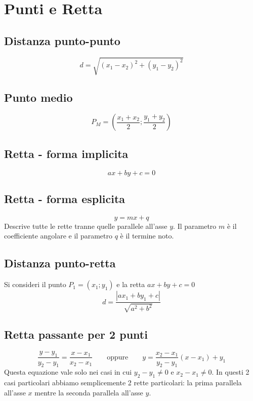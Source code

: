 \documentclass{article}
\begin{document}
  \section{Punti e Retta}

  \subsection*{Distanza punto-punto}
  \begin{equation}
    d = \sqrt{(x_1 - x_2)^2 + (y_1 - y_2)^2}
  \end{equation}

  \subsection*{Punto medio}
  \begin{equation}
    P_M = \left(\frac{x_1 + x_2}{2}; \frac{y_1 + y_2}{2}\right)
  \end{equation}

  \subsection*{Retta - forma implicita}
  \begin{equation}
    ax+by+c = 0
  \end{equation}

  \subsection*{Retta - forma esplicita}
  \begin{equation}
    y = mx + q
  \end{equation} 
  Descrive tutte le rette tranne quelle parallele all'asse $y$. Il parametro $m$ è il coefficiente angolare e il parametro $q$ è il termine noto.

  \subsection*{Distanza punto-retta}
  Si consideri il punto $P_1=(x_1;y_1)$ e la retta $ax+by+c=0$
  \begin{equation}
    d = \frac{|ax_1 +by_1 + c|}{\sqrt{a^2+b^2}}
  \end{equation}

  \subsection*{Retta passante per 2 punti}
  \begin{equation}
    \frac{y-y_1}{y_2-y_1} = \frac{x-x_1}{x_2-x_1}
    \qquad\text{oppure}\qquad
    y = \frac{x_2-x_1}{y_2-y_1}(x-x_1) + y_1
  \end{equation}
  Questa equazione vale solo nei casi in cui $y_2-y_1 \ne 0$ e $x_2-x_1 \ne 0$. In questi 2 casi particolari abbiamo semplicemente 2 rette particolari: la prima parallela all'asse $x$ mentre la seconda parallela all'asse $y$.
\end{document}
